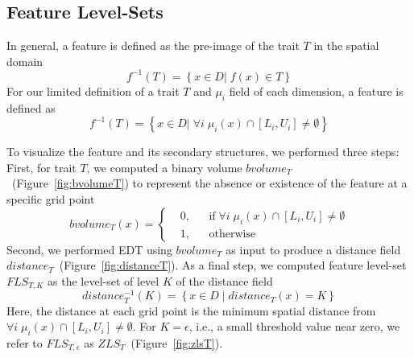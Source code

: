 \vspace{-2mm}
\subsection{Feature Level-Sets}
\label{sec:fls}
In general, a feature is defined as the pre-image of the trait $T$ in the spatial domain
\begin{equation}
f^{-1}(T) = \left\{ x \in D |\; f(x) \in T \right\}
\end{equation}
%
For our limited definition of a trait $T$ and ${\mu}_{i}$ field of each dimension, a feature is defined as 
\begin{equation}
f^{-1}(T) = \left\{ x \in D |\; \forall i\;{\mu}_{i}(x) \cap [L_{i}, U_{i}] \neq \emptyset\right\}
\end{equation}





To visualize the feature and its secondary structures, we performed three steps:
%
First, for trait $T$, we computed a binary volume $bvolume_{T}$~(Figure~\ref{fig:bvolumeT}) to represent the absence or existence of the feature at a specific grid point
%
\begin{equation}
  bvolume_{T}(x) = \left \{
  \begin{aligned}
    &0, && \text{if}\; \forall i\; {\mu}_{i}(x) \cap [L_{i}, U_{i}] \neq \emptyset \\
    &1, && \text{otherwise}
  \end{aligned} \right.
\end{equation}
%
Second, we performed EDT using $bvolume_{T}$ as input to produce a distance field $distance_{T}$~(Figure~\ref{fig:distanceT}). 
%
%
As a final step, we computed feature level-set $FLS_{T,K}$ as the level-set of level $K$ of the distance field
%
\begin{equation} 
distance_{T}^{-1}(K) = \left\{ x \in D\; |\; distance_{T}(x) = K\right\}
\end{equation}
%
Here, the distance at each grid point is the minimum spatial distance from $\forall i\; \mu_{i}(x) \cap [L_{i}, U_{i}] \neq \emptyset$.
%
For $K = \epsilon$, i.e., a small threshold value near zero, we refer to $FLS_{T,\epsilon}$ as $ZLS_{T}$~(Figure~\ref{fig:zlsT}).
%
%

